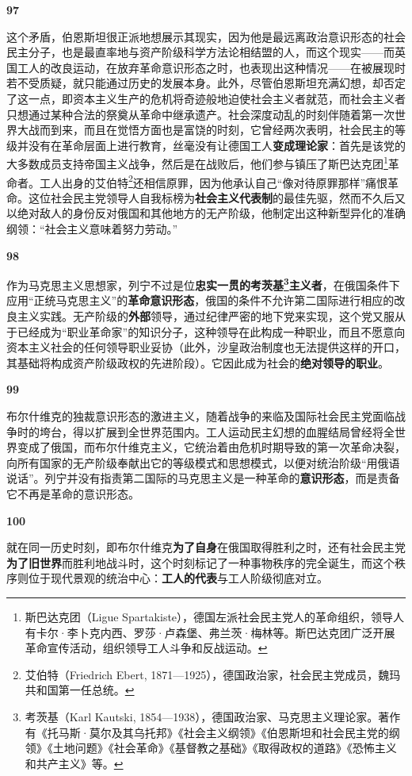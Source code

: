 \documentclass[fontset=fandol, a4paper, 12pt, openright]{ctexbook}
\makeatletter
\newcommand{\thesis}[1]{%
    \par\vspace{1.5em}%
    {\centering \textbf{\Large #1}\par}%
    \nobreak\vspace{0.5em}\nobreak
    \@afterindenttrue %
    \@afterheading    %
}
\makeatother
\begin{document}
\thesis{97}
这个矛盾，伯恩斯坦很正派地想展示其现实，因为他是最远离政治意识形态的社会民主分子，也是最直率地与资产阶级科学方法论相结盟的人，而这个现实——而英国工人的改良运动，在放弃革命意识形态之时，也表现出这种情况——在被展现时若不受质疑，就只能通过历史的发展本身。此外，尽管伯恩斯坦充满幻想，却否定了这一点，即资本主义生产的危机将奇迹般地迫使社会主义者就范，而社会主义者只想通过某种合法的祭奠从革命中继承遗产。社会深度动乱的时刻伴随着第一次世界大战而到来，而且在觉悟方面也是富饶的时刻，它曾经两次表明，社会民主的等级并没有在革命层面上进行教育，丝毫没有让德国工人\textbf{变成理论家}：首先是该党的大多数成员支持帝国主义战争，然后是在战败后，他们参与镇压了斯巴达克团\footnote{斯巴达克团（Ligue Spartakiste），德国左派社会民主党人的革命组织，领导人有卡尔·李卜克内西、罗莎·卢森堡、弗兰茨·梅林等。斯巴达克团广泛开展革命宣传活动，组织领导工人斗争和反战运动。}革命者。工人出身的艾伯特\footnote{艾伯特（Friedrich Ebert, 1871—1925），德国政治家，社会民主党成员，魏玛共和国第一任总统。}还相信原罪，因为他承认自己“像对待原罪那样”痛恨革命。这位社会民主党领导人自我标榜为\textbf{社会主义代表制}的最佳先驱，然而不久后又以绝对敌人的身份反对俄国和其他地方的无产阶级，他制定出这种新型异化的准确纲领：“社会主义意味着努力劳动。”

\thesis{98}
作为马克思主义思想家，列宁不过是位\textbf{忠实一贯的考茨基\footnote{考茨基（Karl Kautski, 1854—1938），德国政治家、马克思主义理论家。著作有《托马斯·莫尔及其乌托邦》《社会主义纲领》《伯恩斯坦和社会民主党的纲领》《土地问题》《社会革命》《基督教之基础》《取得政权的道路》《恐怖主义和共产主义》等。}主义者}，在俄国条件下应用“正统马克思主义”的\textbf{革命意识形态}，俄国的条件不允许第二国际进行相应的改良主义实践。无产阶级的\textbf{外部}领导，通过纪律严密的地下党来实现，这个党又服从于已经成为“职业革命家”的知识分子，这种领导在此构成一种职业，而且不愿意向资本主义社会的任何领导职业妥协（此外，沙皇政治制度也无法提供这样的开口，其基础将构成资产阶级政权的先进阶段）。它因此成为社会的\textbf{绝对领导的职业}。

\thesis{99}
布尔什维克的独裁意识形态的激进主义，随着战争的来临及国际社会民主党面临战争时的垮台，得以扩展到全世界范围内。工人运动民主幻想的血腥结局曾经将全世界变成了俄国，而布尔什维克主义，它统治着由危机时期导致的第一次革命决裂，向所有国家的无产阶级奉献出它的等级模式和思想模式，以便对统治阶级“用俄语说话”。列宁并没有指责第二国际的马克思主义是一种革命的\textbf{意识形态}，而是责备它不再是革命的意识形态。

\thesis{100}
就在同一历史时刻，即布尔什维克\textbf{为了自身}在俄国取得胜利之时，还有社会民主党\textbf{为了旧世界}而胜利地战斗时，这个时刻标记了一种事物秩序的完全诞生，而这个秩序则位于现代景观的统治中心：\textbf{工人的代表}与工人阶级彻底对立。
\end{document}

